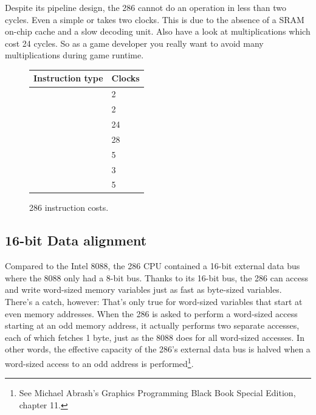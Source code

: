 \documentclass[book.tex]{subfiles}
\begin{document}
Despite its pipeline design, the 286 cannot do an operation in less than two cycles. Even a simple  or  takes two clocks. This is due to the absence of a SRAM on-chip cache and a slow decoding unit. Also have a look at multiplications which cost 24 cycles. So as a game developer you really want to avoid many multiplications during game runtime.\\
 \par
 

  \begin{figure}[H]
\centering  
\begin{tabularx}{\textwidth}{ X  Y }
  \toprule
  \textbf{Instruction type} &  \textbf{Clocks} \\
  \toprule 
    & 2  \\
    & 2  \\
    & 24  \\
    & 28 \\
    & 5 \\
    & 3 \\
    & 5 \\
  \toprule
\end{tabularx}
\caption{286 instruction costs\protect\footnotemark.}
\end{figure}
\addtocounter{footnote}{-1}


\subsection{16-bit Data alignment}
Compared to the Intel 8088, the 286 CPU contained a 16-bit external data bus where the 8088 only had a 8-bit bus. Thanks to its 16-bit bus, the 286 can access and write word-sized memory variables just as fast as byte-sized variables. There's a catch, however: That's only true for word-sized variables that start at even memory addresses. When the 286 is asked to perform a word-sized access starting at an odd memory address, it actually performs two separate accesses, each of which fetches 1 byte, just as the 8088 does for all word-sized accesses. In other words, the effective capacity of the 286's external data bus is halved when a word-sized access to an odd address is performed\footnote{See Michael Abrash's Graphics Programming Black Book Special Edition, chapter 11.}.\\
\end{document}
